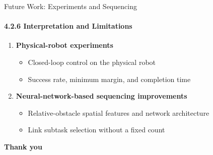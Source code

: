 \documentclass[t,10pt,handout]{beamer}
\newenvironment{slidebody}{\begin{minipage}[t][68.5mm][s]{\linewidth}\vspace{0pt}}{\par\vspace{0pt}\end{minipage}}
\begin{document}
\begin{frame}[label=future-work]{Future Work: Experiments and Sequencing}
  \framesubtitle{4.2.6 Interpretation and Limitations}
  \begin{slidebody}
    \vfill
    \begin{enumerate}\setlength{\itemsep}{10mm}
      \item \textbf{Physical-robot experiments}
            \begin{itemize}\normalsize\setlength{\itemsep}{3mm}
              \item Closed-loop control on the physical robot
              \item Success rate, minimum margin, and completion time
            \end{itemize}
      \item \textbf{Neural-network-based sequencing improvements}
            \begin{itemize}\normalsize\setlength{\itemsep}{3mm}
              \item Relative-obstacle spatial features and network architecture
              \item Link subtask selection without a fixed count
            \end{itemize}
    \end{enumerate}
    \vfill
  \end{slidebody}
\end{frame}

\begin{frame}[c,label=questions]{}
  \centering
  {\color{Accent}\fontsize{28}{34}\selectfont\bfseries Thank you}\par
\end{frame}

\appendix
\end{document}
